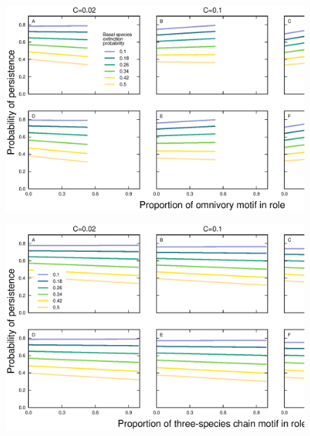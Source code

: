 \documentclass[12pt]{article}
\begin{document}
\begin{spacing}{2.0}
    \begin{figure}[hb!]
        \centering
        \includegraphics[width=\textwidth]{figures/persistence_omnivory_detailpers.eps}
        \caption{}
        \label{omnivory_plus_SC}
        \end{figure}

    \begin{figure}[hb!]
        \centering
        \includegraphics[width=\textwidth]{figures/persistence_chain_detailpers.eps}
        \caption{}
        \label{chain_plus_SC}
        \end{figure}


\end{spacing}
\end{document}
